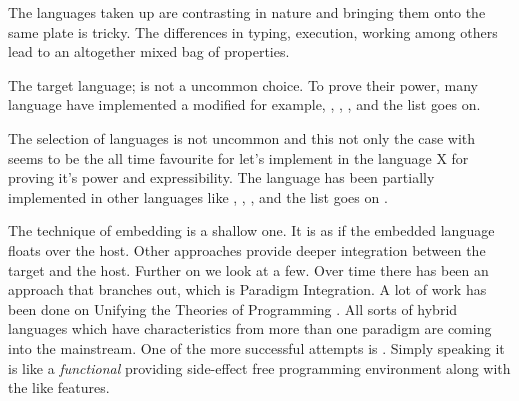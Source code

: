 \documentclass[thesis-solanki.tex]{subfiles}
\begin{document}
The languages taken up are contrasting in nature and bringing them onto the same plate is tricky. The 
differences in typing, execution, working among others lead to an altogether mixed bag of properties.

The target language;  is not a uncommon choice. To prove their power, many language have implemented \cite{swipembedd} a 
modified  for example,  \cite{racklog},   
\cite{komorowski1982qlog,robinson1982loglisp,robinson1980loglisp},  \cite{wikiprolog, jlog}, 
 \cite{jscriptlog} and the list \cite{yieldprolog} goes on. 

The selection of languages is not uncommon and this not only the case with  seems 
to be the all time favourite for let's implement  in the language X for proving it's power and 
expressibility. The  language has been partially implemented \cite{swipembedd} in other 
languages like  \cite{racklog},   
\cite{komorowski1982qlog,robinson1982loglisp,robinson1980loglisp},  \cite{wikiprolog, jlog}, 
 \cite{jscriptlog} and the list \cite{yieldprolog} goes on .    

The technique of embedding is a shallow one.
It is as if the embedded language floats over the host.
Other approaches provide deeper integration between the target and the host. Further on we look at a few.
Over time there has been an approach that branches out, which is Paradigm Integration.
A lot of work has been done on Unifying the Theories of Programming
\cite{DBLP:conf/utp/2006,DBLP:conf/utp/2008,DBLP:conf/utp/2010,DBLP:conf/utp/2012,hoare1998unifying,
  gibbons2013unifying}.
All sorts of hybrid languages which have characteristics from more than one paradigm are coming into the
mainstream.
One of the more successful attempts is \cite{website:scala}. Simply speaking it is like a \textit{functional} 
 providing side-effect free programming environment along with the  like features.
\end{document}
